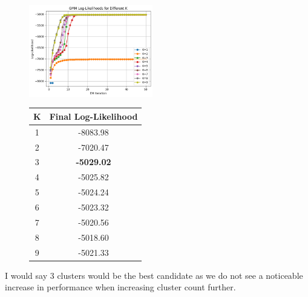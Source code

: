 \documentclass{article}
\begin{document}
\begin{figure}[!ht]
	\centering
	\includegraphics[width=0.48\textwidth]{../../imgs/hw4_2.31.png}
	\qquad
	\begin{tabular}[b]{cc}
		\hline
		\textbf{K} & \textbf{Final Log-Likelihood} \\
		\hline
		1          & -8083.98                      \\
		2          & -7020.47                      \\
		3          & \textbf{-5029.02}             \\
		4          & -5025.82                      \\
		5          & -5024.24                      \\
		6          & -5023.32                      \\
		7          & -5020.56                      \\
		8          & -5018.60                      \\
		9          & -5021.33                      \\
		\hline
	\end{tabular}
\end{figure}
I would say 3 clusters would be the best candidate as we do not see a noticeable increase in performance when increasing cluster count further.
\end{document}
